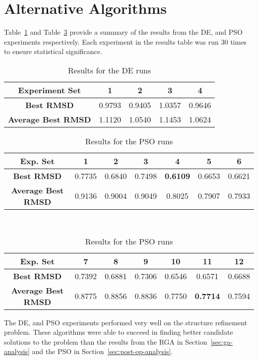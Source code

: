 \section{Alternative Algorithms}

Table~\ref{table:ea-de-results} and Table~\ref{table:ea-pso-results} provide a summary of the results from the DE, and PSO experiments respectively. Each experiment in the results table was run 30 times to ensure statistical significance.

\begin{table}
	\centering
	\begin{tabular}{ | >{\bfseries}c | c | c | c | c | }
		\hline
		Experiment Set & 1 & 2 & 3 & 4 \\ \hline
		Best RMSD & 0.9793 & 0.9405 & 1.0357 & 0.9646 \\ \hline
		Average Best RMSD & 1.1120 & 1.0540 & 1.1453 & 1.0624 \\ \hline
	\end{tabular}
	\caption{Results for the DE runs}
	\label{table:ea-de-results}
\end{table}

\begin{table}
	\centering
	\begin{tabular}{ | >{\bfseries}c | c | c | c | c | c | c | }
		\hline
		Exp. Set & 1 & 2 & 3 & 4 & 5 & 6 \\ \hline
		Best RMSD & 0.7735 & 0.6840 & 0.7498 & \textbf{0.6109} & 0.6653 & 0.6621 \\ \hline
		Average Best RMSD & 0.9136 & 0.9004 & 0.9049 & 0.8025 & 0.7907 & 0.7933 \\ \hline
	\end{tabular}
	\\
	\vspace{3 mm}
	\begin{tabular}{ | >{\bfseries}c | c | c | c | c | c | c | }
		\hline
		Exp. Set & 7 & 8 & 9 & 10 & 11 & 12 \\ \hline
		Best RMSD & 0.7392 & 0.6881 & 0.7306 & 0.6546 & 0.6571 & 0.6688 \\ \hline
		Average Best RMSD & 0.8775 & 0.8856 & 0.8836 & 0.7750 & \textbf{0.7714} & 0.7594 \\ \hline
	\end{tabular}
	\caption{Results for the PSO runs}
	\label{table:ea-pso-results}
\end{table}

The DE, and PSO experiments performed very well on the structure refinement problem. These algorithms were able to succeed in finding better candidate solutions to the problem than the results from the RGA in Section~\ref{sec:ga-analysis} and the PSO in Section~\ref{sec:post-op-analysis}.

